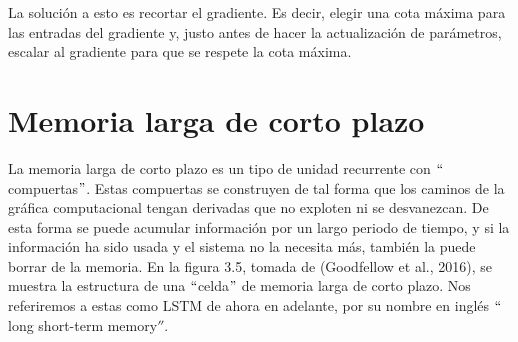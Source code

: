 \vspace{1em}

La solución a esto es recortar el gradiente. Es decir, elegir una cota máxima para las entradas del gradiente y, justo antes de hacer la actualización de parámetros, escalar al gradiente para que se respete la cota máxima.
\cite{goodfellow-et-al-2016}
\cite{DBLP:journals/corr/Graves13}
\cite{DBLP:journals/corr/abs-1211-5063}

\section{Memoria larga de corto plazo}
La memoria larga de corto plazo es un tipo de unidad recurrente con $``$compuertas$"$. Estas compuertas se construyen de tal forma que los caminos de la gráfica computacional tengan derivadas que no exploten ni se desvanezcan. De esta forma se puede acumular información por un largo periodo de tiempo, y si la información ha sido usada y el sistema no la necesita más, también la puede borrar de la memoria. En la figura 3.5, tomada de (Goodfellow et al., 2016), se muestra la estructura de una $``$celda$"$ de memoria larga de corto plazo. Nos referiremos a estas como LSTM de ahora en adelante, por su nombre en inglés $``$long short-term memory$''$.
\cite{Gers:2000}
\cite{goodfellow-et-al-2016}
\cite{Hochreiter:1997:LSM:1246443.1246450}

\vspace{1em}

